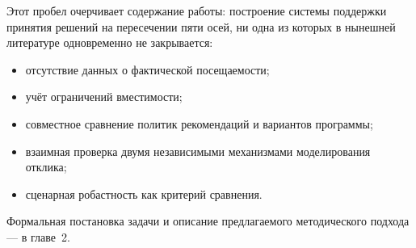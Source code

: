 Этот пробел очерчивает содержание работы: построение системы поддержки принятия решений на пересечении пяти осей, ни одна из которых в нынешней литературе одновременно не закрывается:

\begin{itemize}
\item отсутствие данных о фактической посещаемости;
\item учёт ограничений вместимости;
\item совместное сравнение политик рекомендаций и вариантов программы;
\item взаимная проверка двумя независимыми механизмами моделирования отклика;
\item сценарная робастность как критерий сравнения.
\end{itemize}

Формальная постановка задачи и описание предлагаемого методического подхода --- в главе~2.
